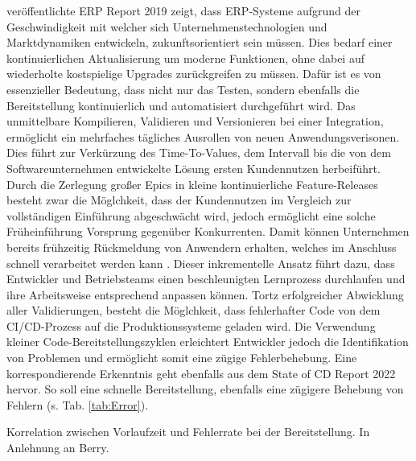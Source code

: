 veröffentlichte ERP Report 2019 zeigt, dass ERP-Systeme aufgrund der Geschwindigkeit mit welcher sich Unternehmenstechnologien und Marktdynamiken entwickeln, zukunftsorientiert sein müssen. Dies bedarf einer kontinuierlichen Aktualisierung um moderne Funktionen, ohne dabei auf wiederholte kostspielige Upgrades zurückgreifen zu müssen. Dafür ist es von essenzieller Bedeutung, dass nicht nur das Testen, sondern ebenfalls die Bereitstellung kontinuierlich und automatisiert durchgeführt wird. Das unmittelbare Kompilieren, Validieren und Versionieren bei einer Integration, ermöglicht ein mehrfaches tägliches Ausrollen von neuen Anwendungsverisonen. Dies führt zur Verkürzung des Time-To-Values, dem Intervall bis die von dem Softwareunternehmen entwickelte Lösung ersten Kundennutzen herbeiführt. Durch die Zerlegung großer Epics in kleine kontinuierliche Feature-Releases besteht zwar die Möglchkeit, dass der Kundennutzen im Vergleich zur vollständigen Einführung abgeschwächt wird, jedoch ermöglicht eine solche Früheinführung Vorsprung gegenüber Konkurrenten. Damit können Unternehmen bereits frühzeitig Rückmeldung von Anwendern erhalten, welches im Anschluss schnell verarbeitet werden kann \cite[9]{Halstenberg.2020}. Dieser inkrementelle Ansatz führt dazu, dass Entwickler und Betriebsteams einen beschleunigten Lernprozess durchlaufen und ihre Arbeitsweise entsprechend anpassen können. Tortz erfolgreicher Abwicklung aller Validierungen, besteht die Möglchkeit, dass fehlerhafter Code von dem CI/CD-Prozess auf die Produktionssysteme geladen wird. Die Verwendung kleiner Code-Bereitstellungszyklen erleichtert Entwickler jedoch die Identifikation von Problemen und ermöglicht somit eine zügige Fehlerbehebung. Eine korrespondierende Erkenntnis geht ebenfalls aus dem State of CD Report 2022 hervor. So soll eine schnelle Bereitstellung, ebenfalls eine zügigere Behebung von Fehlern (s. Tab. \ref{tab:Error}). 
\begin{center}
	\begin{table}[H]
		\centering
		\caption[Korrelation zwischen Vorlaufzeit und Fehlerate bei der Bereitstellung]{Korrelation zwischen Vorlaufzeit und Fehlerrate bei der Bereitstellung. In Anlehnung an Berry.}
		\label{tab:Error}
	\end{table}
\end{center}
\vspace*{-15mm} 
